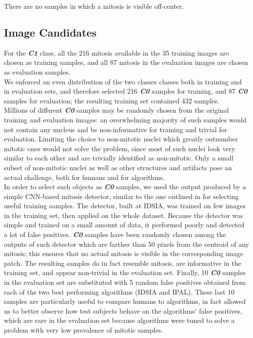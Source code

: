 There are no samples in which a mitosis is visible off-center.

\vspace{0.5cm}

\subsection{Image Candidates}

For the \textit{\textbf{C1}} class, all the 216 mitosis available in the 35 training images are chosen
as training samples, and all 87 mitosis in the evaluation images are chosen as
evaluation samples.\\
We enforced an even distribution of the two classes classes both in training and in evaluation sets, and therefore
selected 216 \textit{\textbf{C0}} samples for training, and 87 \textit{\textbf{C0}} samples for evaluation; the resulting
training set contained 432 samples.\\
Millions of different \textit{\textbf{C0}} samples may be randomly chosen from the original training and evaluation images:
an overwhelming majority of such samples would not contain any nucleus and be non-informative for training and trivial for
evaluation. Limiting the choice to non-mitotic nuclei \texttwelveudash{} which greatly outnumber
mitotic ones \texttwelveudash{} would not solve the problem, since most of such nuclei look very
similar to each other and are trivially identified as non-mitotic. Only a small
subset of non-mitotic nuclei \texttwelveudash{} as well as other structures and artifacts \texttwelveudash{} pose an
actual challenge, both for humans and for algorithms.\\
In order to select such objects as \textit{\textbf{C0}} samples, we used the output produced by a simple \Gls{CNN}-based mitosis detector,
similar to the one outlined in \cite{agNN} for selecting useful training samples.
The detector, built at IDSIA, was trained on few images in the training set, then applied on the whole dataset.
Because the detector was simple and trained on a small amount of data, it performed poorly and detected a lot of false positives.
\textit{\textbf{C0}} samples have been randomly chosen among the outputs of such detector which are
farther than 50 pixels from the centroid of any mitosis; this ensures that no actual
mitosis is visible in the corresponding image patch. The resulting samples do in
fact resemble mitosis, are informative in the training set, and appear non-trivial
in the evaluation set. Finally, 10 \textit{\textbf{C0}} samples in the evaluation set are substituted
with 5 random false positives obtained from each of the two best performing
algorithms (IDSIA and IPAL). These last 10 samples are particularly useful to compare humans to algorithms, in fact allowed us to better observe how test subjects
behave on the algorithms’ false positives, which are rare in the evaluation set because
algorithms were tuned to solve a problem with very low prevalence of mitotic samples.


